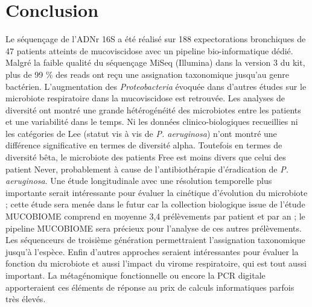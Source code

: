 \documentclass[12pt,a4paper]{article}
\begin{document}
\section{Conclusion}
Le séquençage de l'ADNr 16S a été réalisé sur 188 expectorations bronchiques de 47 patients atteints de mucoviscidose avec un pipeline bio-informatique dédié. Malgré la faible qualité du séquençage MiSeq (Illumina) dans la version 3 du kit, plus de 99 \% des reads ont reçu une assignation taxonomique jusqu'au genre bactérien. L'augmentation des \textit{Proteobacteria} évoquée dans d'autres études sur le microbiote respiratoire dans la mucoviscidose est retrouvée. Les analyses de diversité ont montré une grande hétérogénéité des microbiotes entre les patients et une variabilité dans le temps. Ni les données clinico-biologiques recueillies ni les catégories de Lee (statut vis à vis de \textit{P. aeruginosa}) n'ont montré une différence significative en termes de diversité alpha. Toutefois en termes de diversité bêta, le microbiote des patients Free est moins divers que celui des patient Never, probablement à cause de l'antibiothérapie d'éradication de \textit{P. aeruginosa}.
Une étude longitudinale avec une résolution temporelle plus importante serait intéressante pour évaluer la cinétique d'évolution du microbiote ; cette étude sera menée dans le futur car la collection biologique issue de l'étude MUCOBIOME comprend en moyenne 3,4 prélèvements par patient et par an ; le pipeline MUCOBIOME sera précieux pour l'analyse de ces autres prélèvements. Les séquenceurs de troisième génération permettraient l'assignation taxonomique jusqu'à l'espèce.
Enfin d'autres approches seraient intéressantes pour évaluer la fonction du microbiote et aussi l'impact du virome respiratoire, qui est tout aussi important. La métagénomique fonctionnelle ou encore la PCR digitale apporteraient ces éléments de réponse au prix de calculs informatiques parfois très élevés.






\clearpage


\newpage
\pagestyle{empty}
\end{document}
